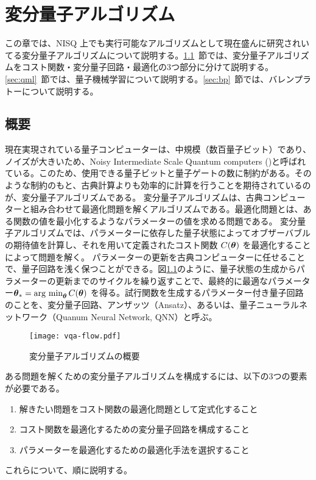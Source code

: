 \chapter{変分量子アルゴリズム}\label{chap:vqa}
この章では、NISQ 上でも実行可能なアルゴリズムとして現在盛んに研究されいてる変分量子アルゴリズムについて説明する。\ref{sec:vqc}~節では、変分量子アルゴリズムをコスト関数・変分量子回路・最適化の3つ部分に分けて説明する。\ref{sec:qml}~節では、量子機械学習について説明する。\ref{sec:bp}~節では、バレンプラトーについて説明する。

\section{概要}\label{sec:vqc}
現在実現されている量子コンピューターは、中規模（数百量子ビット）であり、ノイズが大きいため、Noisy Intermediate Scale Quantum computers ()と呼ばれている\cite{preskill2018quantum}。このため、使用できる量子ビットと量子ゲートの数に制約がある。そのような制約のもと、古典計算よりも効率的に計算を行うことを期待されているのが、変分量子アルゴリズムである。
変分量子アルゴリズムは、古典コンピューターと組み合わせて最適化問題を解くアルゴリズムである。最適化問題とは、ある関数の値を最小化するようなパラメーターの値を求める問題である。
変分量子アルゴリズムでは、パラメーターに依存した量子状態によってオブザーバブルの期待値を計算し、それを用いて定義されたコスト関数 $C(\boldsymbol{\theta})$ を最適化することによって問題を解く。
パラメーターの更新を古典コンピューターに任せることで、量子回路を浅く保つことができる。図\ref{fig:vqa-flow}のように、量子状態の生成からパラメーターの更新までのサイクルを繰り返すことで、最終的に最適なパラメーター$\boldsymbol{\theta}_* = \operatorname*{arg~min}_{\boldsymbol{\theta}} C(\boldsymbol{\theta})$ を得る。試行関数を生成するパラメーター付き量子回路のことを、変分量子回路、アンザッツ（Ansatz）、あるいは、量子ニューラルネットワーク（Quanum Neural Network, QNN）と呼ぶ。
\begin{figure}[H]
    \centering
    \texttt{[image: vqa-flow.pdf]}
    \caption{変分量子アルゴリズムの概要}
    \label{fig:vqa-flow}
\end{figure}

ある問題を解くための変分量子アルゴリズムを構成するには、以下の3つの要素が必要である。
\begin{enumerate}
    \item 解きたい問題をコスト関数の最適化問題として定式化すること
    \item コスト関数を最適化するための変分量子回路を構成すること
    \item パラメーターを最適化するための最適化手法を選択すること
\end{enumerate}
これらについて、順に説明する。

